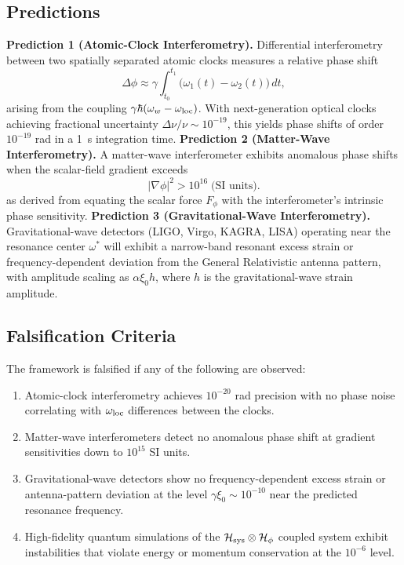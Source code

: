 \documentclass[conference,letterpaper,10pt]{IEEEtran}
\begin{document}
\subsection{Predictions}
\textbf{Prediction 1 (Atomic-Clock Interferometry).} Differential interferometry between two spatially separated
atomic clocks measures a relative phase shift
\begin{equation}
\Delta\phi \approx \gamma\int_{t_0}^{t_1}\!\bigl(\omega_1(t) - \omega_2(t)\bigr)\,dt,
\label{eq:phase}
\end{equation}
arising from the coupling \(\gamma\hbar(\omega_w - \omega_{\rm loc})\). With next-generation optical clocks achieving
fractional uncertainty \(\Delta\nu/\nu \sim 10^{-19}\), this yields phase shifts of order \(10^{-19}\) rad in a
\SI{1}{\second} integration time.
\textbf{Prediction 2 (Matter-Wave Interferometry).} A matter-wave interferometer exhibits anomalous phase shifts when
the scalar-field gradient exceeds
\begin{equation}
|\nabla\phi|^2 > 10^{16}\;\text{(SI units)}.
\label{eq:gradient-threshold}
\end{equation}
as derived from equating the scalar force \(F_\phi\) with the interferometer's intrinsic phase sensitivity.
\textbf{Prediction 3 (Gravitational-Wave Interferometry).} Gravitational-wave detectors (LIGO, Virgo, KAGRA, LISA)
operating near the resonance center \(\omega^*\) will exhibit a narrow-band resonant excess strain or
frequency-dependent deviation from the General Relativistic antenna pattern, with amplitude scaling as \(\alpha\xi_0
h\), where \(h\) is the gravitational-wave strain amplitude.

\subsection{Falsification Criteria}
The framework is falsified if any of the following are observed:
\begin{enumerate}
\item Atomic-clock interferometry achieves \(10^{-20}\) rad precision with no phase noise correlating with \(\omega_{\rm
loc}\) differences between the clocks.
\item Matter-wave interferometers detect no anomalous phase shift at gradient sensitivities down to \(10^{15}\) SI
units.
\item Gravitational-wave detectors show no frequency-dependent excess strain or antenna-pattern deviation at the level
 \(\gamma\xi_0 \sim 10^{-10}\) near the predicted resonance frequency.
\item High-fidelity quantum simulations of the \(\mathcal{H}_{\rm sys}\otimes\mathcal{H}_\phi\) coupled system exhibit
instabilities that violate energy or momentum conservation at the \(10^{-6}\) level.
\end{enumerate}
\end{document}
